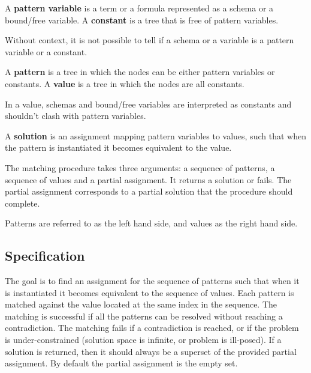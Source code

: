 \begin{definition}
A \textbf{pattern variable} is a term or a formula represented as a schema or a bound/free variable.
A \textbf{constant} is a tree that is free of pattern variables.
\end{definition}

Without context, it is not possible to tell if a schema or a variable is a pattern variable or a constant.

\begin{definition}
A \textbf{pattern} is a tree in which the nodes can be either pattern variables or constants.
A \textbf{value} is a tree in which the nodes are all constants.
\end{definition}

In a value, schemas and bound/free variables are interpreted as constants and shouldn't clash with pattern variables.

\begin{definition}
A \textbf{solution} is an assignment mapping pattern variables to values, such that when the pattern is instantiated it becomes equivalent to the value.
\end{definition}

The matching procedure takes three arguments: a sequence of patterns, a sequence of values and a partial assignment. It returns a solution or fails. The partial assignment corresponds to a partial solution that the procedure should complete.

Patterns are referred to as the left hand side, and values as the right hand side.

\subsection{Specification}

The goal is to find an assignment for the sequence of patterns such that when it is instantiated it becomes equivalent to the sequence of values. Each pattern is matched against the value located at the same index in the sequence. The matching is successful if all the patterns can be resolved without reaching a contradiction. The matching fails if a contradiction is reached, or if the problem is under-constrained (solution space is infinite, or problem is ill-posed). If a solution is returned, then it should always be a superset of the provided partial assignment. By default the partial assignment is the empty set.

